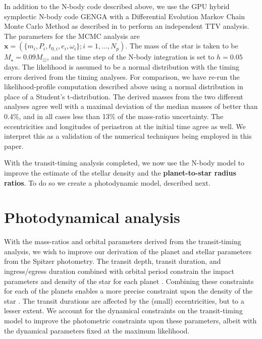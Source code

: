 \documentclass[twocolumn]{aastex63}
\begin{document}
In addition to the N-body code described above, we use the GPU hybrid symplectic N-body code GENGA \citep{Grimm2014} with a Differential Evolution Markov Chain Monte Carlo Method  \citep[DEMCMC;][]{terBraak2006} as described in \citet{Grimm2018} to perform an independent TTV analysis. The parameters for the MCMC analysis are $\mathbf{x} = (\{m_i, P_i,t_{0,i},e_i,\omega_i\};i=1,...,N_p)$. The mass of the star is taken to be $M_{\star} = 0.09 M_{\odot}$, and the time step of the N-body integration is set to $h=0.05$ days.  The
likelihood is assumed to be a normal distribution with the timing errors derived from
the timing analyses.  For comparison, we have re-run the likelihood-profile
computation described above using a normal distribution in place of a Student's t-distribution.
The derived masses from the two different analyses agree well with a maximal deviation of the median masses of better than 0.4\%, and in all cases less than 13\% of the mass-ratio uncertainty.  The eccentricities and longitudes of periastron at the initial time agree as well.  We interpret this as a validation of the numerical techniques being employed in this paper.

With the transit-timing analysis completed, we now use the N-body model to improve the estimate of the stellar density and the \textbf{planet-to-star radius ratios}.  To do so we create a photodynamic model, described next.

\section{Photodynamical analysis}\label{sec:photodynamics}

With the mass-ratios and orbital parameters derived from the transit-timing
analysis, we wish to improve our derivation of the planet and stellar parameters
from the Spitzer photometry.   The transit depth, transit duration, and ingress/egress
duration combined with  orbital period constrain the impact parameters and density
of the star for each planet \citep{Seager2003}.  Combining these constraints for
each of the planets  enables a more precise constraint upon the density of the
star \citep{Kipping2012a}.
The transit durations are affected by the (small) eccentricities, but to a lesser extent.  We account
for the dynamical constraints on the transit-timing model to improve the
photometric constraints upon these parameters, albeit with the dynamical parameters fixed
at the maximum likelihood.
\end{document}
